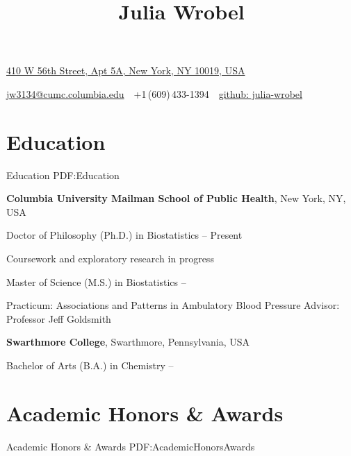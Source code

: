 \documentclass[a4paper,10pt,oneside]{article}
\begin{document}

\title{Julia Wrobel}

\begin{subtitle}
\href{https://www.google.com/maps/place/410+W+56th+St,+New+York,+NY+10019/data=!4m2!3m1!1s0x89c25859bcae35b7:0x89a39ba199133773?sa=X&ved=0CB0Q8gEwAGoVChMI8szxwbLexwIVBJqACh152AeC}
{410 W 56th Street, Apt 5A, New York, NY 10019, USA}
\par
\href{mailto:jw3134@cumc.columbia.edu}
{jw3134@cumc.columbia.edu}
\,\BulletSymbol\,
+1\,(609)\,433-1394
\,\BulletSymbol\,
\href{https://github.com/julia-wrobel}
{github: julia-wrobel}
\end{subtitle}

\begin{body}


\section
{Education}
{Education}
{PDF:Education}


{\textbf{Columbia University Mailman School of Public Health}},
New York, NY, USA

\SmallEntryGap
Doctor of Philosophy (Ph.D.) in Biostatistics
\hfill
{} -- Present
\begin{detail}
\BulletItem
Coursework and exploratory research in progress
\end{detail}

\SmallEntryGap
Master of Science (M.S.) in Biostatistics
\hfill
{} --
\begin{detail}
\BulletItem
Practicum:
Associations and Patterns in Ambulatory Blood Pressure 
\hfill
\BulletItem
Advisor:
Professor Jeff Goldsmith
\end{detail}

\EntryGap
\textbf{Swarthmore College},
Swarthmore, Pennsylvania, USA
\par
Bachelor of Arts (B.A.) in Chemistry
\hfill
{} --


\section
{Academic Honors\newline
\& Awards}
{Academic Honors \& Awards}
{PDF:AcademicHonorsAwards}


\end{body}
\end{document}
